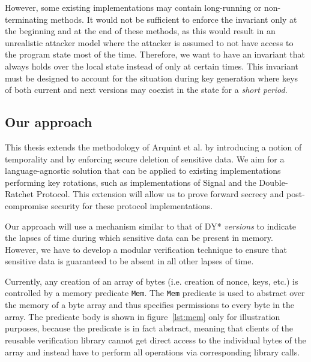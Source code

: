 \documentclass{article}
\begin{document}
However, some existing implementations may contain long-running or non-terminating methods. It would not be sufficient to enforce the invariant only at the beginning and at the end of these methods, as this would result in an unrealistic attacker model where the attacker is assumed to not have access to the program state most of the time. Therefore, we want to have an invariant that always holds over the local state instead of only at certain times. 
This invariant must be designed to account for the situation during key generation where keys of both current and next versions may coexist in the state for a \emph{short period}.



\subsection{Our approach}
\label{sec:our-approach}

This thesis extends the methodology of Arquint et al. by introducing a notion of temporality and by enforcing secure deletion of sensitive data.
We aim for a language-agnostic solution that can be applied to existing implementations performing key rotations, such as implementations of Signal and the Double-Ratchet Protocol. This extension will allow us to prove forward secrecy and post-compromise security for these protocol implementations.

Our approach will use a mechanism similar to that of DY* \emph{versions} to indicate the lapses of time during which sensitive data can be present in memory.
However, we have to develop a modular verification technique to ensure that sensitive data is guaranteed to be absent in all other lapses of time.

Currently, any creation of an array of bytes (i.e. creation of nonce, keys, etc.) is controlled by a memory predicate \texttt{Mem}.
The \texttt{Mem} predicate is used to abstract over the memory of a byte array and thus specifies permissions to every byte in the array.
The predicate body is shown in figure~\ref{lst:mem} only for illustration purposes, because the predicate is in fact abstract, meaning that clients of the reusable verification library cannot get direct access to the individual bytes of the array and instead have to perform all operations via corresponding library calls.
\end{document}
